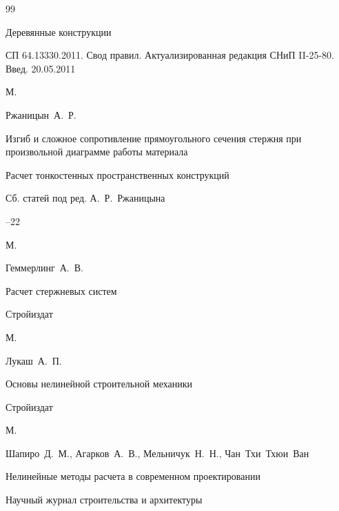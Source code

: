 \begin{thebibliography}{99}

\book  Деревянные конструкции

\bookinfo СП 64.13330.2011. Свод правил. Актуализированная редакция СНиП II-25-80.  Введ.  20.05.2011


\publaddr М.







\by Ржаницын~А.~Р.

\paper Изгиб и сложное сопротивление прямоугольного сечения стержня при произвольной диаграмме работы материала 

\inbook Расчет тонкостенных пространственных конструкций

\bookinfo Сб. статей под ред. А.~Р.~Ржаницына


--22

\publaddr М.






\by Геммерлинг~А.~В.

\book Расчет стержневых систем


\publ Стройиздат

\publaddr М.







\by Лукаш~А.~П.

\book Основы нелинейной строительной механики


\publ Стройиздат

\publaddr М.







\by Шапиро~Д.~М., Агарков~А.~В., Мельничук~Н.~Н., Чан~Тхи~Тхюи~Ван

\paper Нелинейные методы расчета в современном проектировании

\jour Научный журнал строительства и архитектуры



\end{thebibliography}
